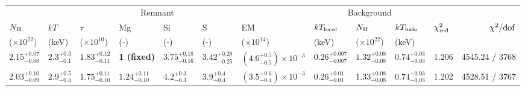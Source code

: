 \begin{tabular}{@{}lllllllllllr@{}}
  \toprule
  \multicolumn{7}{c}{Remnant} & \multicolumn{3}{c}{Background} & \\
  \cmidrule(r){1-7} \cmidrule(lr){8-10}
  $N_\mathrm{H}$ & $kT$ & $\tau$ & Mg & Si & S & EM
    & $k T_{\mathrm{local}}$ & $N_\mathrm{H}$ & $k T_{\mathrm{halo}}$
    & $\chi^2_{\mathrm{red}}$ & $\chi^2 / \mathrm{dof}$ \\
  ($\times 10^{22}$) & (keV) & ($\times 10^{10}$) & (-) & (-) & (-) & ($\times 10^{14}$)
    & (keV) & ($\times 10^{22}$) & (keV) &  &  \\
  \midrule
  ${2.15}^{+0.07}_{-0.08}$ & ${2.3}^{+0.3}_{-0.1}$ & ${1.83}^{+0.12}_{-0.11}$ & \textbf{1 (fixed)}       & ${3.75}^{+0.18}_{-0.16}$ & ${3.42}^{+0.28}_{-0.25}$ & $\left(4.6^{+0.5}_{-0.5}\right)\times10^{-3}$
    & ${0.26}^{+0.007}_{-0.007}$ & ${1.32}^{+0.08}_{-0.08}$ & ${0.74}^{+0.03}_{-0.03}$ & 1.206 & 4545.24 / 3768 \\
  ${2.03}^{+0.10}_{-0.09}$ & ${2.9}^{+0.5}_{-0.4}$ & ${1.75}^{+0.11}_{-0.10}$ & ${1.24}^{+0.11}_{-0.10}$ & ${4.2}^{+0.3}_{-0.3}$ & ${3.9}^{+0.4}_{-0.4}$ & $\left(3.5^{+0.6}_{-0.4}\right)\times10^{-3}$
    & ${0.26}^{+0.01}_{-0.01}$ & ${1.33}^{+0.08}_{-0.08}$ & ${0.74}^{+0.03}_{-0.03}$ & 1.202 & 4528.51 / 3767 \\
  \bottomrule
\end{tabular}
